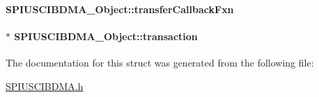 \paragraph[{transfer\-Callback\-Fxn}]{ S\-P\-I\-U\-S\-C\-I\-B\-D\-M\-A\-\_\-\-Object\-::transfer\-Callback\-Fxn}\label{struct_s_p_i_u_s_c_i_b_d_m_a___object_aa0f097248d6ba037d9c6fd40a0e13575}
\paragraph[{transaction}]{$\ast$ S\-P\-I\-U\-S\-C\-I\-B\-D\-M\-A\-\_\-\-Object\-::transaction}\label{struct_s_p_i_u_s_c_i_b_d_m_a___object_a5befed95856b2c43b79b6a8eb5c67b0d}


The documentation for this struct was generated from the following file\-:\begin{DoxyCompactItemize}
\item 
\hyperlink{_s_p_i_u_s_c_i_b_d_m_a_8h}{S\-P\-I\-U\-S\-C\-I\-B\-D\-M\-A.\-h}\end{DoxyCompactItemize}
